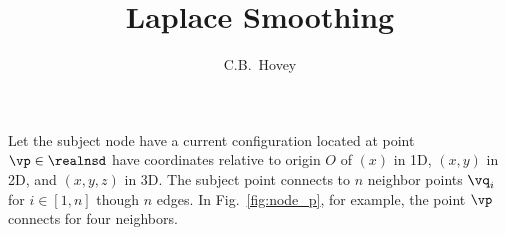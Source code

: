 \documentclass[11pt, oneside]{article}   	%
\title{Laplace Smoothing}
\author{C.B.~Hovey}
\begin{document}
\maketitle


% 
% 
% 
% 


Let the subject node have a current configuration located at
point $\vp \in \realnsd$ have coordinates relative to origin $O$
of
$(x)$ in 1D,
$(x, y)$ in 2D,
and $(x, y, z)$ in 3D.
The subject point connects to $n$ neighbor points
$\vq_i$ for $i \in [1, n]$ though $n$ edges.
In Fig.~\ref{fig:node_p}, for example, the point $\vp$ connects for four
neighbors.
\end{document}
